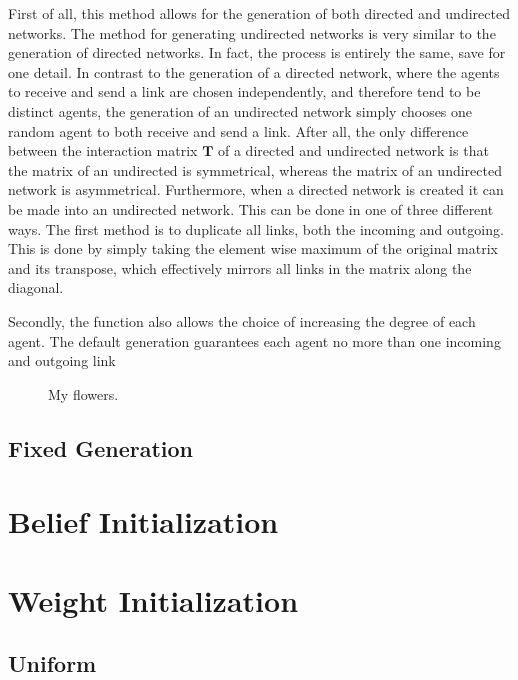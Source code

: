 \documentclass{article}
\newcommand{\T}{\textbf{T}}
\begin{document}
First of all, this method allows for the generation of both directed and undirected networks. The method for generating undirected networks is very similar to the generation of directed networks. In fact, the process is entirely the same, save for one detail. In contrast to the generation of a directed network, where the agents to receive and send a link are chosen independently, and therefore tend to be distinct agents, the generation of an undirected network simply chooses one random agent to both receive and send a link. After all, the only difference between the interaction matrix $\T$ of a directed and undirected network is that the matrix of an undirected is symmetrical, whereas the matrix of an undirected network is asymmetrical. \newline
Furthermore, when a directed network is created it can be made into an undirected network. This can be done in one of three different ways. The first method is to duplicate all links, both the incoming and outgoing. This is done by simply taking the element wise maximum of the original matrix and its transpose, which effectively mirrors all links in the matrix along the diagonal. \newline

Secondly, the function also allows the choice of increasing the degree of each agent. The default generation guarantees each agent no more than one incoming and outgoing link

\begin{figure}[!tbp]
  \centering
  \hfill
  \caption{My flowers.}
\end{figure}


\subsection{Fixed Generation}

\section{Belief Initialization}

\section{Weight Initialization}
\subsection{Uniform}
\end{document}
